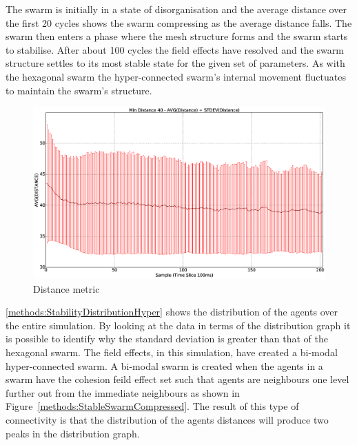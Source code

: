 The swarm is initially in a state of disorganisation and the average distance over the first 20 cycles shows the swarm compressing as the average distance falls. The swarm then enters a phase where the mesh structure forms and the swarm starts to stabilise. After about 100 cycles the field effects have resolved and the swarm structure settles to its most stable state for the given set of parameters. As with the hexagonal swarm the hyper-connected swarm's internal movement fluctuates to maintain the swarm's structure.
\begin{figure}[H]
\begin{center}
\includegraphics[width=13cm]{CHAPTER-5/figures/StabilityDistanceSwarm40-60}
\end{center}
\caption{Distance metric\label{methods:StabilityDistanceSwarm40-60}}
\end{figure}

\autoref{methods:StabilityDistributionHyper} shows the distribution of the agents over the entire simulation. By looking at the data in terms of the distribution graph it is possible to identify why the standard deviation is greater than that of the hexagonal swarm. The field effects, in this simulation, have created a bi-modal hyper-connected swarm. A bi-modal swarm is created when the agents in a swarm have the cohesion feild effect set such that agents are neighbours one level further out from the immediate neighbours as shown in Figure~\ref{methods:StableSwarmCompressed}. The result of this type of connectivity is that the distribution of the agents distances will produce two peaks in the distribution graph.

